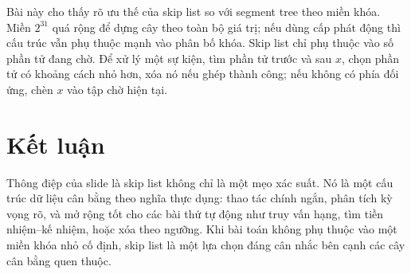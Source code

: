 \documentclass[11pt]{article}
\begin{document}
Bài này cho thấy rõ ưu thế của skip list so với segment tree theo miền khóa.
Miền \(2^{31}\) quá rộng để dựng cây theo toàn bộ giá trị; nếu dùng cấp phát
động thì cấu trúc vẫn phụ thuộc mạnh vào phân bố khóa. Skip list chỉ phụ
thuộc vào số phần tử đang chờ. Để xử lý một sự kiện, tìm phần tử trước và sau
\(x\), chọn phần tử có khoảng cách nhỏ hơn, xóa nó nếu ghép thành công; nếu
không có phía đối ứng, chèn \(x\) vào tập chờ hiện tại.

\section{Kết luận}

Thông điệp của slide là skip list không chỉ là một mẹo xác suất. Nó là một
cấu trúc dữ liệu cân bằng theo nghĩa thực dụng: thao tác chính ngắn, phân
tích kỳ vọng rõ, và mở rộng tốt cho các bài thứ tự động như truy vấn hạng,
tìm tiền nhiệm--kế nhiệm, hoặc xóa theo ngưỡng. Khi bài toán không phụ thuộc
vào một miền khóa nhỏ cố định, skip list là một lựa chọn đáng cân nhắc bên
cạnh các cây cân bằng quen thuộc.
\end{document}
